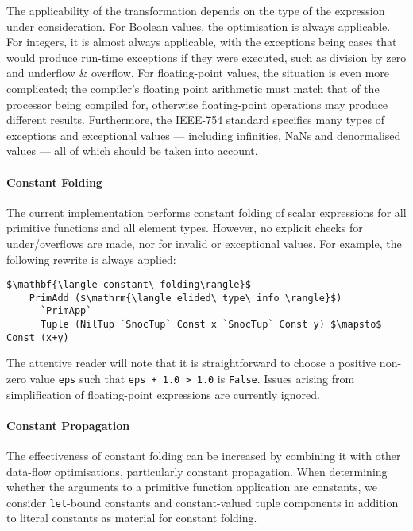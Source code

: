 The applicability of the transformation depends on the type of the expression
under consideration. For Boolean values, the optimisation is always applicable.
For integers, it is almost always applicable, with the exceptions being cases
that would produce run-time exceptions if they were executed, such as division
by zero and underflow \& overflow. For floating-point values, the situation is
even more complicated; the compiler's floating point arithmetic must match that
of the processor being compiled for, otherwise floating-point operations may
produce different results. Furthermore, the IEEE-754 standard specifies many
types of exceptions and exceptional values --- including infinities, NaNs and
denormalised values --- all of which should be taken into account.

\paragraph{Constant Folding}

The current implementation performs constant folding of scalar expressions for
all primitive functions and all element types. However, no explicit checks for
under/overflows are made, nor for invalid or exceptional values. For example,
the following rewrite is always applied:
%
%
\begin{lstlisting}[style=Haskell,numbers=none,mathescape]
$\mathbf{\langle constant\ folding\rangle}$
    PrimAdd ($\mathrm{\langle elided\ type\ info \rangle}$)
      `PrimApp`
      Tuple (NilTup `SnocTup` Const x `SnocTup` Const y) $\mapsto$ Const (x+y)
\end{lstlisting}
%
The attentive reader will note that it is straightforward to choose a positive
non-zero value \texttt{eps} such that \lstinline{eps + 1.0 > 1.0} is
\texttt{False}. Issues arising from simplification of floating-point expressions
are currently ignored.


\paragraph{Constant Propagation}

The effectiveness of constant folding can be increased by combining it with
other data-flow optimisations, particularly constant propagation. When
determining whether the arguments to a primitive function application are
constants, we consider \texttt{let}-bound constants and constant-valued tuple
components in addition to literal constants as material for constant folding.


